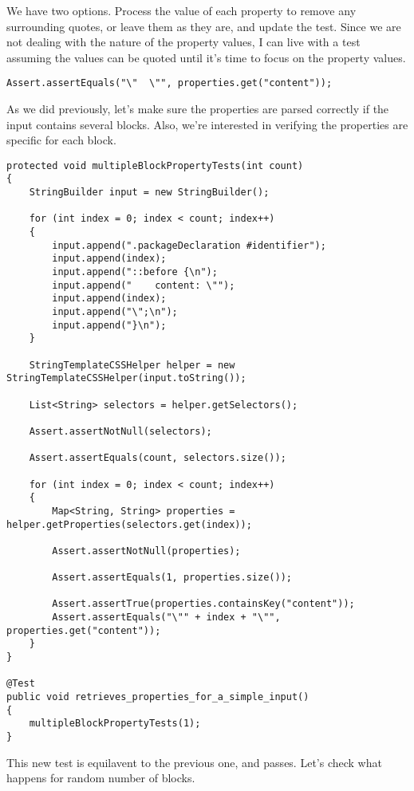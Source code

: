 \documentclass[11pt]{article}
\begin{document}
We have two options. Process the value of each property to remove any surrounding quotes, or leave them as they are, and update the test. Since we are not dealing with the nature of the property values, I can live with a test assuming the values can be quoted until it's time to focus on the property values.

\begin{verbatim}
Assert.assertEquals("\"  \"", properties.get("content"));
\end{verbatim}

As we did previously, let's make sure the properties are parsed correctly if the input contains several blocks. Also, we're interested in verifying the properties are specific for each block.

\begin{verbatim}
protected void multipleBlockPropertyTests(int count)
{
    StringBuilder input = new StringBuilder();

    for (int index = 0; index < count; index++)
    {
        input.append(".packageDeclaration #identifier");
        input.append(index);
        input.append("::before {\n");
        input.append("    content: \"");
        input.append(index);
        input.append("\";\n");
        input.append("}\n");
    }

    StringTemplateCSSHelper helper = new StringTemplateCSSHelper(input.toString());

    List<String> selectors = helper.getSelectors();

    Assert.assertNotNull(selectors);

    Assert.assertEquals(count, selectors.size());

    for (int index = 0; index < count; index++)
    {
        Map<String, String> properties = helper.getProperties(selectors.get(index));

        Assert.assertNotNull(properties);

        Assert.assertEquals(1, properties.size());

        Assert.assertTrue(properties.containsKey("content"));
        Assert.assertEquals("\"" + index + "\"", properties.get("content"));
    }
}

@Test
public void retrieves_properties_for_a_simple_input()
{
    multipleBlockPropertyTests(1);
}
\end{verbatim}

This new test is equilavent to the previous one, and passes. Let's check what happens for random number of blocks.
\end{document}
